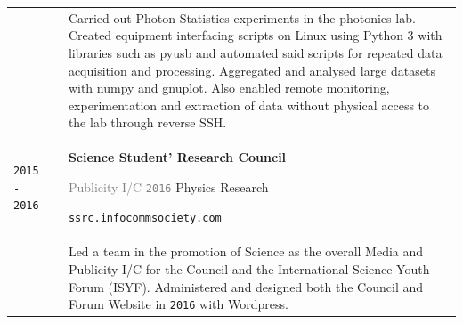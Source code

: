 \documentclass[11pt]{article}
\newcommand{\monoSp}[1]{{\usefont{T1}{rbtm}{m}{n} #1}}
\newcommand{\urllinkout}[2]{\href{#1}{\textcolor{text_link}{\small \texttt{#2}}}}
\newcommand{\code}[1]{\colorbox{code_back}{\monoSp{#1}}}
\begin{document}
{\begin{tabularx}{\textwidth}{@{}l p{0.3cm} X@{}}
		&& {\small Carried out Photon Statistics experiments in the photonics lab. Created equipment interfacing scripts on Linux using \code{Python 3} with libraries such as \code{pyusb} and automated said scripts for repeated data acquisition and processing. Aggregated and analysed large datasets with \code{numpy} and \code{gnuplot}. Also enabled remote monitoring, experimentation and extraction of data without physical access to the lab through reverse \code{SSH}. } \\
		\texttt{\large 2015 - 2016} & & \textbf{Science Student' Research Council} \par\textcolor{gray}{Publicity I/C \hspace{1em} \texttt{2016}} \hfill Physics Research\par \urllinkout{https://ssrc.infocommsociety.com/}{ssrc.infocommsociety.com}\\[-0.5em]
		&& Led a team in the promotion of Science as the overall Media and Publicity I/C for the Council and the International Science Youth Forum {\footnotesize (ISYF)}. Administered and designed both the Council and Forum Website in \texttt{\large 2016} with \code{Wordpress}. 
	\end{tabularx}
}
\end{document}
